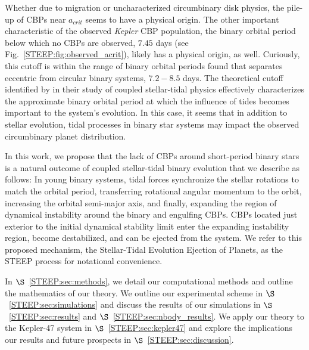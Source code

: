 Whether due to migration or uncharacterized circumbinary disk physics, the pile-up of CBPs near $a_{crit}$ seems to have a physical origin.  The other important characteristic of the observed {\it Kepler} CBP population, the binary orbital period below which no CBPs are observed, $7.45$ days (see Fig.~\ref{STEEP:fig:observed_acrit}), likely has a physical origin, as well.  Curiously, this cutoff is within the range of binary orbital periods \citet{Zahn1989} found that separates eccentric from circular binary systems, $7.2-8.5$ days.  The theoretical cutoff identified by \citet{Zahn1989} in their study of coupled stellar-tidal physics effectively characterizes the approximate binary orbital period at which the influence of tides becomes important to the system's evolution.  In this case, it seems that in addition to stellar evolution, tidal processes in binary star systems may impact the observed circumbinary planet distribution.

In this work, we propose that the lack of CBPs around short-period binary stars is a natural outcome of coupled stellar-tidal binary evolution that we describe as follows:  In young binary systems, tidal forces synchronize the stellar rotations to match the orbital period, transferring rotational angular momentum to the orbit, increasing the orbital semi-major axis, and finally, expanding the region of dynamical instability around the binary and engulfing CBPs.  CBPs located just exterior to the initial dynamical stability limit enter the expanding instability region, become destabilized, and can be ejected from the system.  We refer to this proposed mechanism, the Stellar-Tidal Evolution Ejection of Planets, as the STEEP process for notational convenience.  

In $\S$~\ref{STEEP:sec:methods}, we detail our computational methods and outline the mathematics of our theory.  We outline our experimental scheme in $\S$~\ref{STEEP:sec:simulations} and discuss the results of our simulations in $\S$~\ref{STEEP:sec:results} and $\S$~\ref{STEEP:sec:nbody_results}.  We apply our theory to the Kepler-47 system in $\S$~\ref{STEEP:sec:kepler47} and explore the implications our results and future prospects in $\S$~\ref{STEEP:sec:discussion}.



